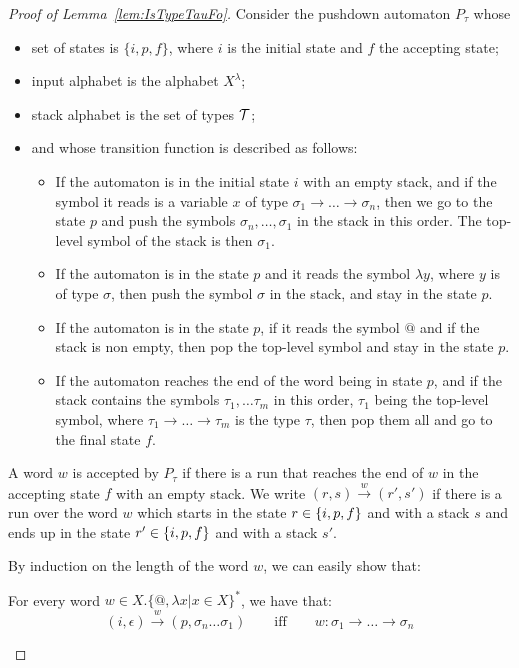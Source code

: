 \begin{proof}[Proof of Lemma~\ref{lem:IsTypeTauFo}]

Consider the pushdown automaton $P_\tau$ whose
\begin{itemize}
\item  set of states is $\{i, p, f\}$, where $i$ is the initial state and $f$ the accepting state;
\item input alphabet is the alphabet $X^\lambda$;
\item stack alphabet is the set of types ${\mathcal T}$;
\item and whose transition function is described as follows:
\begin{itemize}
\item If the automaton is in the initial state $i$ with an empty stack, and if the symbol it reads is a variable $x$ of type $\sigma_1\rightarrow\dots\rightarrow\sigma_n$, then we go to the state $p$ and push the symbols $\sigma_n,\dots,\sigma_1$  in the stack in this order. The top-level symbol of the stack is then $\sigma_1$.
\item If the automaton is in the state $p$ and it reads the symbol $\lambda y$, where $y$ is of type $\sigma$, then push the symbol $\sigma$ in the stack, and stay in the state $p$.
\item  If the automaton is in the state $p$,  if it reads the symbol $@$ and if the stack is non empty, then pop the top-level symbol and stay in the state $p$.
\item If the automaton reaches the end of the word being in state $p$, and if the stack contains the symbols $\tau_1,\dots\tau_m$ in this order, $\tau_1$ being the top-level symbol, where $\tau_1\rightarrow\dots\rightarrow\tau_m$ is the type $\tau$, then pop them all and go to the final state $f$.  
\end{itemize}
\end{itemize}
A word $w$ is accepted by $P_\tau$ if there is a run that reaches the end of $w$ in the accepting state $f$ with an empty stack. We write $(r, s)\xrightarrow{w} (r', s')$ if there is a run over the word $w$ which starts in the state $r\in\{i, p,f\}$ and with a stack $s$ and ends up in the state $r'\in\{i, p,f\}$ and with a stack $s'$.


By induction on the length of the word $w$, we can easily show that:
\begin{lemma}
For every word $w\in X.\{@,\lambda x | x\in X \}^*$, we have that:
 $$(i, \epsilon)\xrightarrow{w} (p, \sigma_n\dots\sigma_1) \qquad\text{iff} \qquad 
w:\sigma_1\rightarrow\dots\rightarrow\sigma_n$$ 
\end{lemma}


\end{proof}
